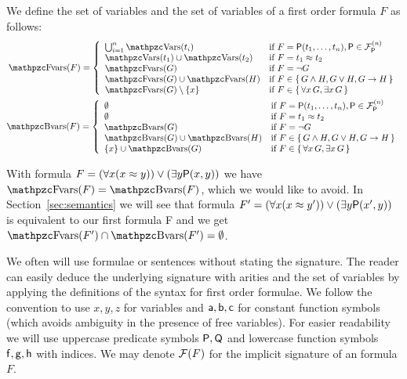 \begin{definition}\label{def:fof:fvars}\label{def:fof:bvars}
	We define the set of  variables and the set of  variables
	of a first order formula \( F \) as follows:
\begin{gather*}
	\MDEFINE{\fvar(F)}{ll}{
		\bigcup_{i=1}^n \var(t_i)
		&\text{if }F
		= \mP(t_1,\ldots,t_n), \mP\in\mcFPn
		\\
		\var(t_1)\cup\var(t_2)
		&\text{if }F
		= t_1\mEQ t_2
		\\
		\fvar(G)&\text{if }F = \lnot G
		\\
		\fvar(G) \cup \fvar(H)&\text{if }F \in \{ \, G\land H,G \lor H,G\limp H \, \}
		\\
		\fvar (G) \setminus \{ x\} &\text{if } F \in \{ \, \forall x \, G, \exists x \, G \, \}
	}
	\\
\MDEFINE{\bvar(F)}{ll}{
	\emptyset &\text{if }F = \mP(t_1,\ldots,t_n), \mP\in\mcFPn
	\\
	\emptyset &\text{if }F = t_1\mEQ t_2
	\\
	\bvar(G)&\text{if }F = \lnot G
	\\
	\bvar(G) \cup \bvar(H)&\text{if }F \in \{ \, G \land H, G \lor H, G \limp H \, \}
	\\
	\{ x\} \cup \bvar (G) &\text{if } F \in \{ \, \forall x \, G, \exists x\,G \, \}
}
\end{gather*}
\end{definition}

\begin{example}
	With formula \( F = (\forall x (x\approx y)) \lor (\exists y \mathsf{P}(x,y)) \)
	we have \( \fvar(F) = \bvar(F) \), which we would like to avoid.
	In Section~\vref{sec:semantics} we will see that formula
	\( F' = (\forall x (x\approx y')) \lor (\exists y \mathsf{P}(x',y)) \)
	is equivalent to our first formula F
	and we get
	\( \fvar(F') \cap \bvar(F') = \emptyset \).
\end{example}

We often will use formulae or sentences
without stating the signature.
The reader can easily deduce the underlying  signature with arities
and the set of variables by applying the definitions of the syntax for first order formulae.
We follow the convention to use \( x,y,z \) for variables
and \( \mathsf{a},\mathsf{b},\mathsf{c} \) for constant function symbols
(which avoids ambiguity in the presence of free variables).
For easier readability we will use
uppercase predicate symbols \(\mathsf{P},\mathsf{Q} \) and
lowercase function symbols \( \mathsf{f},\mathsf{g},\mathsf{h} \) with indices.
We may denote \( \mathcal{F}(F) \) for the implicit signature of an formula \( F \).

